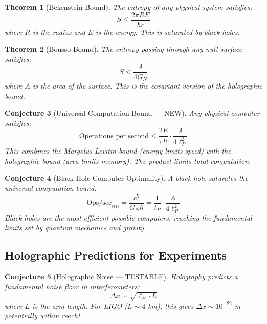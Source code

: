 \documentclass[12pt,a4paper]{article}
\newtheorem{theorem}{Theorem}[section]
\newtheorem{conjecture}[theorem]{Conjecture}
\begin{document}
\begin{theorem}[Bekenstein Bound]
The entropy of any physical system satisfies:
\begin{equation}
S \leq \frac{2\pi R E}{\hbar c}
\end{equation}
where $R$ is the radius and $E$ is the energy. This is saturated by black holes.
\end{theorem}

\begin{theorem}[Bousso Bound]
The entropy passing through any null surface satisfies:
\begin{equation}
S \leq \frac{A}{4G_N}
\end{equation}
where $A$ is the area of the surface. This is the covariant version of the holographic bound.
\end{theorem}

\begin{conjecture}[Universal Computation Bound --- NEW]
Any physical computer satisfies:
\begin{equation}
\text{Operations per second} \leq \frac{2E}{\pi \hbar} \cdot \frac{A}{4 \ell_P^2}
\end{equation}
This combines the Margolus-Levitin bound (energy limits speed) with the holographic bound (area limits memory). The product limits total computation.
\end{conjecture}

\begin{conjecture}[Black Hole Computer Optimality]
A black hole saturates the universal computation bound:
\begin{equation}
\text{Ops/sec}_{\text{BH}} = \frac{c^5}{G_N \hbar} = \frac{1}{t_P} \cdot \frac{A}{4\ell_P^2}
\end{equation}
Black holes are the most efficient possible computers, reaching the fundamental limits set by quantum mechanics and gravity.
\end{conjecture}

\subsection{Holographic Predictions for Experiments}

\begin{conjecture}[Holographic Noise --- TESTABLE]
Holography predicts a fundamental noise floor in interferometers:
\begin{equation}
\Delta x \sim \sqrt{\ell_P \cdot L}
\end{equation}
where $L$ is the arm length. For LIGO ($L \sim 4$ km), this gives $\Delta x \sim 10^{-22}$ m---potentially within reach!
\end{conjecture}
\end{document}
